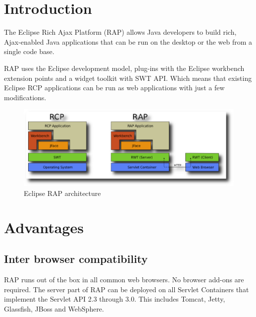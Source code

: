 \section{Introduction}
The Eclipse Rich Ajax Platform (RAP) allows Java
developers to build rich, Ajax-enabled Java applications that can be run on the
desktop or the web from a single code base.

RAP uses the Eclipse development model, plug-ins with the Eclipse workbench
extension points and a widget toolkit with SWT API. Which means that existing
Eclipse RCP applications can be run as web applications with just a few
modifications.

\begin{figure}[!htb]
  \begin{center}
    \includegraphics[scale=0.6]{Figures/Architecture_RAP.eps}
  \end{center}
  \caption{Eclipse RAP architecture}
  \label{Eclipse RAP architecture}
\end{figure}

\section{Advantages}
\subsection{Inter browser compatibility}
RAP runs out of the box in all common web browsers. No browser add-ons are
required. The server part of RAP can be deployed on all Servlet Containers that
implement the Servlet API 2.3 through 3.0. This includes Tomcat, Jetty,
Glassfish, JBoss and WebSphere.

